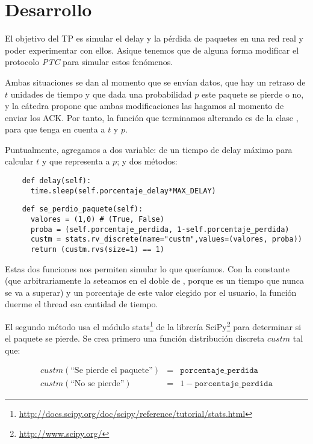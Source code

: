 \section{Desarrollo}

El objetivo del TP es simular el delay y la p\'erdida de paquetes en una red real y poder experimentar con ellos. Asique tenemos que de alguna forma modificar el protocolo \emph{PTC} para simular estos fen\'omenos. 

Ambas situaciones se dan al momento que se env\'ian datos, que hay un retraso de $t$ unidades de tiempo y que dada una probabilidad $p$ este paquete se pierde o no, y la c\'atedra propone que ambas modificaciones las hagamos al momento de enviar los ACK. Por tanto, la funci\'on que terminamos alterando es  de la clase , para que tenga en cuenta a $t$ y $p$. 

Puntualmente, agregamos a  dos variable:  de un tiempo de delay m\'aximo para calcular $t$ y  que representa a $p$; y dos m\'etodos: 

\begin{verbatim}
    def delay(self): 
      time.sleep(self.porcentaje_delay*MAX_DELAY)
\end{verbatim}

\begin{verbatim}
    def se_perdio_paquete(self):
      valores = (1,0) # (True, False)
      proba = (self.porcentaje_perdida, 1-self.porcentaje_perdida)
      custm = stats.rv_discrete(name="custm",values=(valores, proba))
      return (custm.rvs(size=1) == 1)
\end{verbatim}

Estas dos funciones nos permiten simular lo que quer\'iamos. Con la constante  (que arbitrariamente la seteamos en el doble de , porque es un tiempo que nunca se va a superar) y un porcentaje de este valor elegido por el usuario, la funci\'on  duerme el thread esa cantidad de tiempo. 

El segundo m\'etodo usa el m\'odulo stats\footnote{\url{http://docs.scipy.org/doc/scipy/reference/tutorial/stats.html}} de la librer\'ia SciPy\footnote{\url{http://www.scipy.org/}} para determinar si el paquete se pierde. Se crea primero una funci\'on distribuci\'on discreta $custm$ tal que: 

\begin{eqnarray*}
 custm(\text{``Se pierde el paquete''}) &=& \texttt{porcentaje\_perdida} \\
 custm(\text{``No se pierde''}) &=& 1 - \texttt{porcentaje\_perdida}
\end{eqnarray*}

